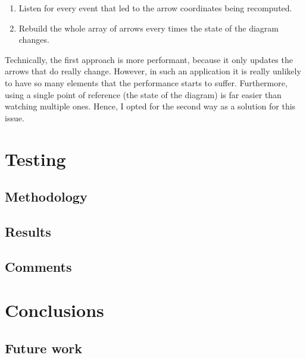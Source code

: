 \documentclass[]{usiinfbachelorproject}
\begin{document}
\begin{enumerate}
	\item Listen for every event that led to the arrow coordinates being recomputed.
	\item Rebuild the whole array of arrows every times the state of the diagram changes.
\end{enumerate}

\noindent Technically, the first approach is more performant, because it only updates the arrows that do really change. However, in such an application it is really unlikely to have so many elements that the performance starts to suffer. Furthermore, using a single point of reference (the state of the diagram) is far easier than watching multiple ones. Hence, I opted for the second way as a solution for this issue.


\vspace{\fill}

\pagebreak

\section{Testing} \label{Testing}


\subsection{Methodology}

\subsection{Results}

\subsection{Comments}

\vspace{\fill}

\pagebreak

\section{Conclusions} \label{Conclusions}

\subsection{Future work}

\vspace{\fill}

\pagebreak



\end{document}
